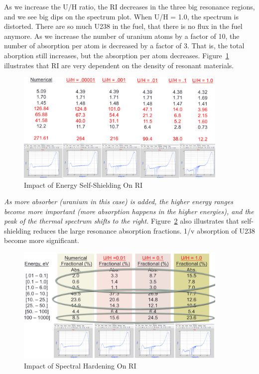 \documentclass{school-22.211-notes}
\begin{document}
As we increase the U/H ratio, the RI decreases in the three big resonance regions, and we see big dips on the spectrum plot. When U/H = 1.0, the spectrum is distorted. There are so much U238 in the fuel, that there is no flux in the fuel anymore. As we increase the number of uranium atoms by a factor of 10, the number of absorption per atom is decreased by a factor of 3. That is, the total aborption still increases, but the absorption per atom decreases. Figure~\ref{self-shielding} illustrates that RI are very dependent on the density of resonant materials. 

\begin{figure}
  \centering
  \includegraphics[width=4in]{images/self-shielding.png}
  \caption{Impact of Energy Self-Shielding On RI} \label{self-shielding}
\end{figure}

\textit{As more absorber (uranium in this case) is added, the higher energy ranges become more important (more absorption happens in the higher energies), and the peak of the thermal spectrum shifts to the right.} Figure~\ref{spectral-hardening} also illustrates that self-shielding reduces the large resonance absorption fractions. 1/v absorption of U238 become more significant. 

\begin{figure}
  \centering
  \includegraphics[width=4in]{images/spectral-hardening.png}
  \caption{Impact of Spectral Hardening On RI} \label{spectral-hardening}
\end{figure}
\end{document}
